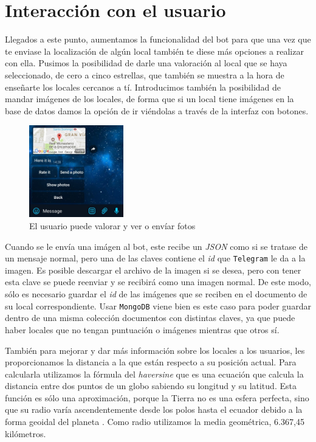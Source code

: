 \documentclass[oneside]{memoir}
\begin{document}
\section{Interacción con el usuario}
Llegados a este punto, aumentamos la funcionalidad del bot para que una vez que te enviase la localización de algún local también te diese más opciones a realizar con ella. Pusimos la posibilidad de darle una valoración al local que se haya seleccionado, de cero a cinco estrellas, que también se muestra a la hora de enseñarte los locales cercanos a tí. Introducimos también la posibilidad de mandar imágenes de los locales, de forma que si un local tiene imágenes en la base de datos damos la opción de ir viéndolas a través de la interfaz con botones.

\begin{figure}[h!]
  \centering
  \includegraphics[height=40mm]{interaccionv2.jpg}
  \caption{El usuario puede valorar y ver o envíar fotos}
  \label{fig:interaccionv2}
\end{figure}

Cuando se le envía una imágen al bot, este recibe un \textit{JSON} como si se tratase de un mensaje normal, pero una de las claves contiene el \textit{id} que \texttt{Telegram} le da a la imagen. Es posible descargar el archivo de la imagen si se desea, pero con tener esta clave se puede reenviar y se recibirá como una imagen normal. De este modo, sólo es necesario guardar el \textit{id} de las imágenes que se reciben en el documento de su local correspondiente. Usar \texttt{MongoDB} viene bien es este caso para poder guardar dentro de una misma colección documentos con distintas claves, ya que puede haber locales que no tengan puntuación o imágenes mientras que otros sí.

También para mejorar y dar más información sobre los locales a los usuarios, les proporcionamos la distancia a la que están respecto a su posición actual. Para calcularla utilizamos la fórmula del \textit{haversine} que es una ecuación que calcula la distancia entre dos puntos de un globo sabiendo su longitud y su latitud. Esta función es sólo una aproximación, porque la Tierra no es una esfera perfecta, sino que su radio varía ascendentemente desde los polos hasta el ecuador debido a la forma geoidal del planeta \cite{haversine}. Como radio utilizamos la media geométrica, 6.367,45 kilómetros.
\end{document}
